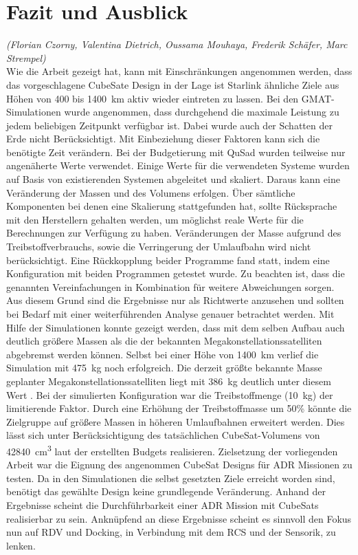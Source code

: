 \chapter{Fazit und Ausblick}
	\hfill\emph{(Florian Czorny, Valentina Dietrich, Oussama Mouhaya, Frederik Schäfer, Marc Strempel)}	\\
Wie die Arbeit gezeigt hat, kann mit Einschränkungen angenommen werden, dass das vorgeschlagene CubeSate Design in der Lage ist Starlink ähnliche Ziele aus Höhen von \num{400} bis \SI{1400}{\km} aktiv wieder eintreten zu lassen. Bei den GMAT-Simulationen wurde angenommen, dass durchgehend die maximale Leistung zu jedem beliebigen Zeitpunkt verfügbar ist. Dabei wurde auch der Schatten der Erde nicht Berücksichtigt. Mit Einbeziehung dieser Faktoren kann sich die benötigte Zeit verändern. Bei der Budgetierung mit QuSad wurden teilweise nur angenäherte Werte verwendet. Einige Werte für die verwendeten Systeme wurden auf Basis von existierenden Systemen abgeleitet und skaliert. Daraus kann eine Veränderung der Massen und des Volumens erfolgen. Über sämtliche Komponenten bei denen eine Skalierung stattgefunden hat, sollte Rücksprache mit den Herstellern gehalten werden, um möglichst reale Werte für die Berechnungen zur Verfügung zu haben.  Veränderungen der Masse aufgrund des Treibstoffverbrauchs, sowie die Verringerung der Umlaufbahn  wird nicht berücksichtigt. Eine Rückkopplung beider Programme fand statt, indem eine Konfiguration mit beiden Programmen getestet wurde. Zu beachten ist, dass die genannten Vereinfachungen in Kombination für weitere Abweichungen sorgen. Aus diesem Grund sind die Ergebnisse nur als Richtwerte anzusehen und sollten bei Bedarf mit einer weiterführenden Analyse genauer betrachtet werden. Mit Hilfe der Simulationen konnte gezeigt werden, dass mit dem selben Aufbau auch deutlich größere Massen als die der bekannten Megakonstellationssatelliten abgebremst werden können. Selbst bei einer Höhe von \SI{1400}{\km} verlief die Simulation mit \SI{475}{\kilogram} noch erfolgreich. Die derzeit größte bekannte Masse geplanter Megakonstellationssatelliten liegt mit \SI{386}{\kilogram} deutlich unter diesem Wert \cite{BenLarbi.2017}. Bei der simulierten Konfiguration war die Treibstoffmenge (\SI{10}{\kilogram}) der limitierende Faktor. Durch eine Erhöhung der Treibstoffmasse um \num{50}\% könnte die Zielgruppe auf größere Massen in höheren Umlaufbahnen erweitert werden. Dies lässt sich unter Berücksichtigung des tatsächlichen CubeSat-Volumens von \SI{42840}{\cubic\cm} laut der erstellten Budgets realisieren.  Zielsetzung der vorliegenden Arbeit war die Eignung des angenommen CubeSat Designs für ADR Missionen zu testen. Da in den Simulationen die selbst gesetzten Ziele erreicht worden sind, benötigt das gewählte Design keine grundlegende Veränderung. Anhand der Ergebnisse scheint die Durchführbarkeit einer ADR Mission mit CubeSats realisierbar zu sein. Anknüpfend an diese Ergebnisse scheint es sinnvoll den Fokus nun auf RDV und Docking, in Verbindung mit dem RCS und der Sensorik, zu lenken.